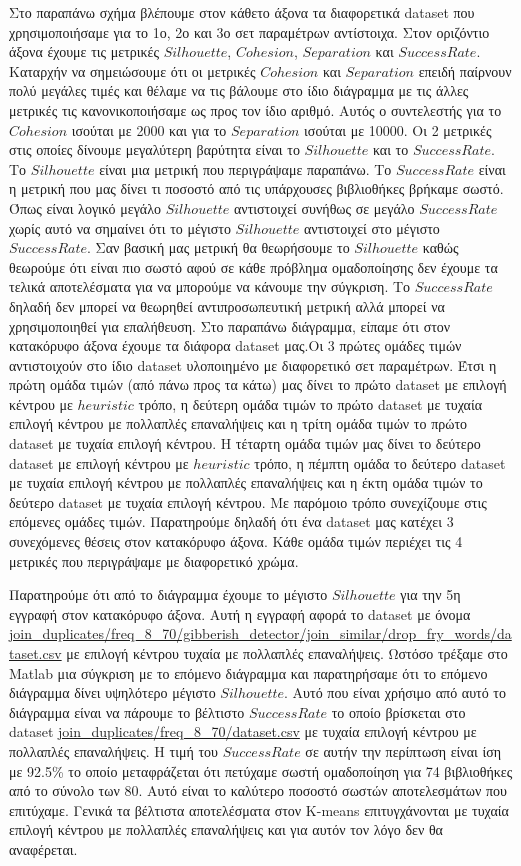 Στο παραπάνω σχήμα βλέπουμε στον κάθετο άξονα τα διαφορετικά dataset που χρησιμοποιήσαμε για το 1ο, 2ο και 3ο σετ παραμέτρων αντίστοιχα. Στον οριζόντιο άξονα έχουμε τις μετρικές $Silhouette$, $Cohesion$, $Separation$ και $Success Rate$. Καταρχήν να σημειώσουμε ότι οι μετρικές $Cohesion$ και $Separation$ επειδή παίρνουν πολύ μεγάλες τιμές και θέλαμε να τις βάλουμε στο ίδιο διάγραμμα με τις άλλες μετρικές τις κανονικοποιήσαμε ως προς τον ίδιο αριθμό. Αυτός ο συντελεστής για το $Cohesion$ ισούται με 2000 και για το $Separation$ ισούται με 10000. 
Οι 2 μετρικές στις οποίες δίνουμε μεγαλύτερη βαρύτητα είναι το $Silhouette$ και το $Success Rate$. Το $Silhouette$ είναι μια μετρική που περιγράψαμε παραπάνω. Το $Success Rate$ είναι η μετρική που μας δίνει τι ποσοστό από τις υπάρχουσες βιβλιοθήκες βρήκαμε σωστό. Όπως είναι λογικό μεγάλο $Silhouette$ αντιστοιχεί συνήθως σε μεγάλο $Success Rate$ χωρίς αυτό να σημαίνει ότι το μέγιστο $Silhouette$ αντιστοιχεί στο μέγιστο $Success Rate$. Σαν βασική μας μετρική θα θεωρήσουμε το $Silhouette$ καθώς θεωρούμε ότι είναι πιο σωστό αφού σε κάθε πρόβλημα ομαδοποίησης δεν έχουμε τα τελικά αποτελέσματα για να μπορούμε να κάνουμε την σύγκριση. Το $Success Rate$ δηλαδή δεν μπορεί να θεωρηθεί αντιπροσωπευτική μετρική αλλά μπορεί να χρησιμοποιηθεί για επαλήθευση. 
Στο παραπάνω διάγραμμα, είπαμε ότι στον κατακόρυφο άξονα έχουμε τα διάφορα dataset μας.Οι 3 πρώτες ομάδες τιμών αντιστοιχούν στο ίδιο dataset υλοποιημένο με διαφορετικό σετ παραμέτρων. Έτσι η πρώτη ομάδα τιμών (από πάνω προς τα κάτω) μας δίνει το πρώτο dataset με επιλογή κέντρου με $heuristic$ τρόπο, η δεύτερη ομάδα τιμών το πρώτο dataset με τυχαία επιλογή κέντρου με πολλαπλές επαναλήψεις και η τρίτη ομάδα τιμών το πρώτο dataset με τυχαία επιλογή κέντρου. Η τέταρτη ομάδα τιμών μας δίνει το δεύτερο dataset με επιλογή κέντρου με $heuristic$ τρόπο, η πέμπτη ομάδα το δεύτερο dataset  με τυχαία επιλογή κέντρου με πολλαπλές επαναλήψεις και η έκτη ομάδα τιμών το δεύτερο dataset με τυχαία επιλογή κέντρου. Με παρόμοιο τρόπο συνεχίζουμε στις επόμενες ομάδες τιμών. Παρατηρούμε δηλαδή ότι ένα dataset μας κατέχει 3 συνεχόμενες θέσεις στον κατακόρυφο άξονα.
Κάθε ομάδα τιμών περιέχει τις 4 μετρικές που περιγράψαμε με διαφορετικό χρώμα.

Παρατηρούμε ότι από το διάγραμμα έχουμε το μέγιστο $Silhouette$ για την 5η εγγραφή στον κατακόρυφο άξονα. Αυτή η εγγραφή αφορά το dataset με όνομα \url{join_duplicates/freq_8_70/gibberish_detector/join_similar/drop_fry_words/dataset.csv} με επιλογή κέντρου τυχαία με πολλαπλές επαναλήψεις. Ωστόσο τρέξαμε στο Matlab μια σύγκριση με το επόμενο διάγραμμα και παρατηρήσαμε ότι το επόμενο διάγραμμα δίνει υψηλότερο μέγιστο $Silhouette$. Αυτό που είναι χρήσιμο από αυτό το διάγραμμα είναι να πάρουμε το βέλτιστο $Success Rate$ το οποίο βρίσκεται στο dataset \url{join_duplicates/freq_8_70/dataset.csv} με τυχαία επιλογή κέντρου με πολλαπλές επαναλήψεις. Η τιμή του $Success Rate$ σε αυτήν την περίπτωση είναι ίση με 92.5\% το οποίο μεταφράζεται ότι πετύχαμε σωστή ομαδοποίηση για 74 βιβλιοθήκες από το σύνολο των 80. Αυτό είναι το καλύτερο ποσοστό σωστών αποτελεσμάτων που επιτύχαμε. Γενικά τα βέλτιστα αποτελέσματα στον K-means επιτυγχάνονται με τυχαία επιλογή κέντρου με πολλαπλές επαναλήψεις και για αυτόν τον λόγο δεν θα αναφέρεται.

